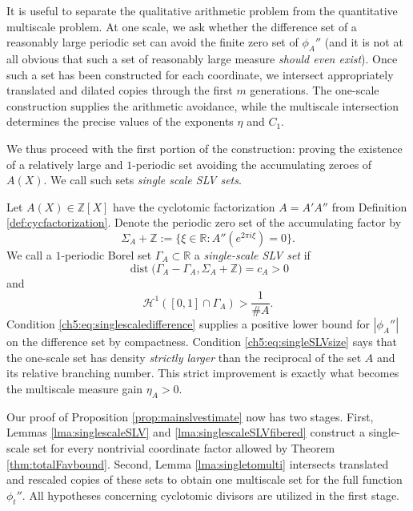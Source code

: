 \documentclass[12pt]{amsart}
\numberwithin{equation}{section}
\begin{document}
It is useful to separate the qualitative arithmetic problem from the quantitative multiscale problem.  At one scale, we ask whether the difference set of a reasonably large periodic set can avoid the finite zero set of $\phi_A''$ (and it is not at all obvious that such a set of reasonably large measure \textit{should even exist}).  Once such a set has been constructed for each coordinate, we intersect appropriately translated and dilated copies through the first $m$ generations.  The one-scale construction supplies the arithmetic avoidance, while the multiscale intersection determines the precise values of the exponents $\eta$ and $C_1$.

We thus proceed with the first portion of the construction: proving the existence of a relatively large and $1$-periodic set avoiding the accumulating zeroes of $A(X)$. We call such sets \textit{single scale SLV sets}.


Let $A(X)\in\mathbb Z[X]$ have the cyclotomic factorization $A=A'A''$ from Definition \ref{def:cycfactorization}.  Denote the periodic zero set of the accumulating factor by
\[
 \Sigma_A+\mathbb Z
 :=\{\xi\in\mathbb R:A''(e^{2\pi i\xi})=0\}.
\]
We call a $1$-periodic Borel set $\Gamma_A\subset\mathbb R$ a \textit{single-scale SLV set} if
\begin{equation}\label{ch5:eq:singlescaledifference}
\operatorname{dist}\bigl(\Gamma_A-\Gamma_A,\Sigma_A+\mathbb Z\bigr)=c_A>0
\end{equation}
and
\begin{equation}\label{ch5:eq:singleSLVsize}
\mathcal H^1([0,1]\cap\Gamma_A)>\frac1{\#A}.
\end{equation}
Condition \eqref{ch5:eq:singlescaledifference} supplies a positive lower bound for $|\phi_A''|$ on the difference set by compactness.  Condition \eqref{ch5:eq:singleSLVsize} says that the one-scale set has density \textit{strictly larger} than the reciprocal of the set $A$ and its relative branching number.  This strict improvement is exactly what becomes the multiscale measure gain $\eta_A>0$.

Our proof of Proposition \ref{prop:mainslvestimate} now has two stages.  First, Lemmas \ref{lma:singlescaleSLV} and \ref{lma:singlescaleSLVfibered} construct a single-scale set for every nontrivial coordinate factor allowed by Theorem \ref{thm:totalFavbound}.  Second, Lemma \ref{lma:singletomulti} intersects translated and rescaled copies of these sets to obtain one multiscale set for the full function $\phi_t''$.  All hypotheses concerning cyclotomic divisors are utilized in the first stage.
\end{document}
